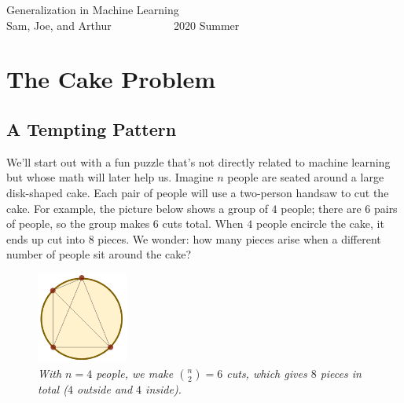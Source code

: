 \documentclass{article}
\begin{document}
    \begin{center}
        \LARGE
        Generalization in Machine Learning \\
        \normalsize
        Sam, Joe, and Arthur ~~~~~~~~~~ 2020 Summer
    \end{center}
        
    \section{The Cake Problem}
        \subsection{A Tempting Pattern}
            We'll start out with a fun puzzle that's not directly related to
            machine learning but whose math will later help us.
            Imagine $n$ people are seated around a large disk-shaped cake.
            Each pair of people will use a two-person handsaw to cut the cake.
            For example, the picture below shows a group of $4$ people; there
            are $6$ pairs of people, so the group makes $6$ cuts total.  When
            $4$ people encircle the cake, it ends up cut into $8$ pieces.  We
            wonder: how many pieces arise when a different number of people sit
            around the cake?
            \begin{figure}[h!]
                \centering
                \includegraphics[height=3cm]{cake-4}
                \caption{\emph{
                    With $n=4$ people, we make ${n\choose 2}=6$ cuts, which gives
                    $8$ pieces in total ($4$ outside and $4$ inside).  
                }}
            \end{figure}
\end{document}
